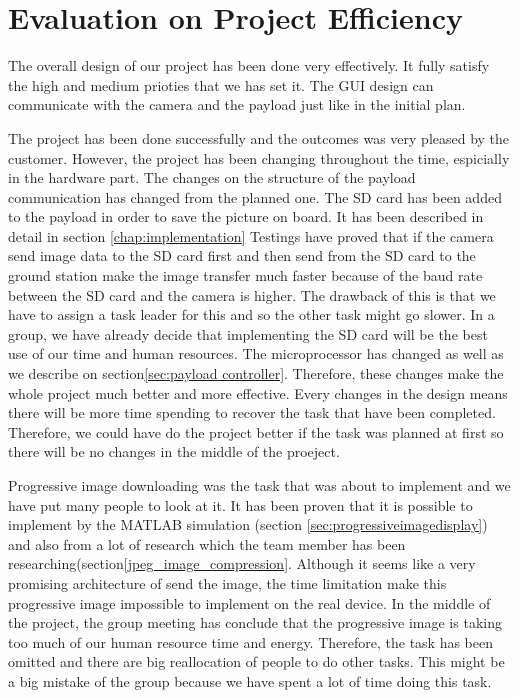 \section{Evaluation on Project Efficiency}

The overall design of our project has been done very effectively.
It fully satisfy the high and medium prioties that we has set it.
The GUI design can communicate with the camera and the payload just like in the initial plan.

The project has been done successfully and the outcomes was very pleased by the customer.
However, the project has been changing throughout the time, espicially in the hardware part.
The changes on the structure of the payload communication has changed from the planned one.
The SD card has been added to the payload in order to save the picture on board.
It has been described in detail in section \ref{chap:implementation}
Testings have proved that if the camera send image data to the SD card first and then send from the SD card to the ground station make the image transfer much faster because of the baud rate between the SD card and the camera is higher.
The drawback of this is that we have to assign a task leader for this and so the other task might go slower.
In a group, we have already decide that implementing the SD card will be the best use of our time and human resources.
The microprocessor has changed as well as we describe on section\ref{sec:payload controller}.
Therefore, these changes make the whole project much better and more effective.
Every changes in the design means there will be more time spending to recover the task that have been completed. 
Therefore, we could have do the project better if the task was planned at first so there will be no changes in the middle of the proeject.

Progressive image downloading was the task that was about to implement and we have put many people to look at it. 
It has been proven that it is possible to implement by the MATLAB simulation (section \ref{sec:progressiveimagedisplay}) and also from a lot of research which the team member has been researching(section\ref{jpeg_image_compression}.
Although it seems like a very promising architecture of send the image, the time limitation make this progressive image impossible to implement on the real device.
In the middle of the project, the group meeting has conclude that the progressive image is taking too much of our human resource time and energy.
Therefore, the task has been omitted and there are big reallocation of people to do other tasks.
This might be a big mistake of the group because we have spent a lot of time doing this task.








